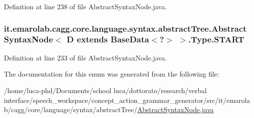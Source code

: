 Definition at line 238 of file Abstract\-Syntax\-Node.\-java.

\hypertarget{enumit_1_1emarolab_1_1cagg_1_1core_1_1language_1_1syntax_1_1abstractTree_1_1AbstractSyntaxNode_3f088e462016145511ce70dc364c19523_af74edeab80e22fa7bdbc96b73ed5c656}{
\subsubsection[{S\-T\-A\-R\-T}]{\setlength{\rightskip}{0pt plus 5cm}it.\-emarolab.\-cagg.\-core.\-language.\-syntax.\-abstract\-Tree.\-Abstract\-Syntax\-Node$<$ D extends Base\-Data$<$?$>$ $>$.Type.\-S\-T\-A\-R\-T}}\label{enumit_1_1emarolab_1_1cagg_1_1core_1_1language_1_1syntax_1_1abstractTree_1_1AbstractSyntaxNode_3f088e462016145511ce70dc364c19523_af74edeab80e22fa7bdbc96b73ed5c656}


Definition at line 233 of file Abstract\-Syntax\-Node.\-java.



The documentation for this enum was generated from the following file\-:\begin{DoxyCompactItemize}
\item 
/home/luca-\/phd/\-Documents/school luca/dottorato/research/verbal interface/speech\-\_\-workspace/concept\-\_\-action\-\_\-grammar\-\_\-generator/src/it/emarolab/cagg/core/language/syntax/abstract\-Tree/\hyperlink{AbstractSyntaxNode_8java}{Abstract\-Syntax\-Node.\-java}\end{DoxyCompactItemize}
